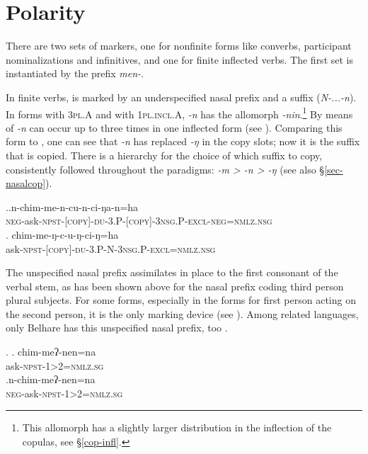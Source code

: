 



\section{Polarity}\label{neg}

There are two sets of  markers, one for nonfinite forms like converbs, participant nominalizations and infinitives, and one for finite inflected verbs. The first set is instantiated by the prefix \emph{men-}. 

In finite verbs,  is marked by an underspecified nasal prefix and a suffix (\emph{N-...-n}). In forms with {\scshape 3pl.A} and with {\scshape 1pl.incl.A}, \emph{-n} has the allomorph \emph{-nin}.\footnote{This allomorph has a slightly larger distribution in the inflection of the copulas, see  §\ref{cop-infl}.} By means of   \emph{-n} can occur up to three times in one inflected form (see \Next[a]). Comparing this form to \Next[b], one can see that \emph{-n} has replaced \emph{-ŋ} in the copy slots; now it is the  suffix that is copied. There is a hierarchy for the choice of which suffix to copy, consistently followed throughout the paradigms: \emph{-m > -n > -ŋ} (see also §\ref{sec-nasalcop}). 

\ex.\ag.n-chim-me-n-cu-n-ci-ŋa-n=ha\\
{\scshape neg-}ask{\scshape -npst-[copy]-du-3.P-[copy]-3nsg.P-excl-neg=nmlz.nsg}\\
	\bg. chim-me-ŋ-c-u-ŋ-ci-ŋ=ha\\
	ask{\scshape -npst-[copy]-du-3.P-N-3nsg.P-excl=nmlz.nsg}\\
	
	
The unspecified nasal prefix assimilates in place to the first consonant of the verbal stem, as has been shown above for the nasal prefix coding third person plural subjects. For some forms, especially in the forms for first person acting on the second person, it is the only  marking device (see \Next). Among related languages, only Belhare has this unspecified nasal prefix, too \citep[554]{Bickel2003Belhare}. 

\ex. \ag.  chim-meʔ-nen=na\\
	 ask{\scshape -npst-1>2=nmlz.sg}\\
		\bg.n-chim-meʔ-nen=na\\
	{\scshape neg-}ask{\scshape -npst-1>2=nmlz.sg}\\

